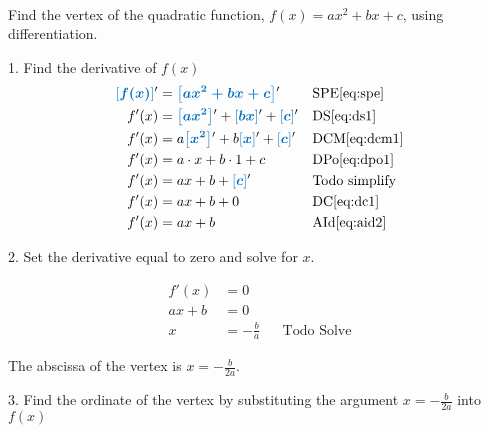 \documentclass[20150903-160354-rs2.2-MarksMathNotebook.tex]{subfiles}
\begin{document}
\begin{example}[id:20151008-110208] \label{20151008-110208} \hfill \\
Find the vertex of the quadratic function, $f(x)=ax^2+bx+c$, using differentiation.

\soln

\solnsteps

1. Find the derivative of $f(x)$
\begin{align*}
\farg{f(x)}' &= \farg{ax^2+bx+c}' && \text{SPE} \eqref{eq:spe} \\
f'(x) &= \farg{ax^2}' + \farg{bx}' + \farg{c}' && \text{DS} \eqref{eq:ds1} \\
f'(x) &= a\farg{x^2}' + b \farg{x}' + \farg{c}' && \text{DCM} \eqref{eq:dcm1} \\
f'(x) &= a \cdot{x} + b \cdot 1 + c && \text{DPo} \eqref{eq:dpo1} \\
f'(x) &= ax + b + \farg{c}'  &&\text{Todo simplify} \\
f'(x) &= ax + b + 0 && \text{DC} \eqref{eq:dc1} \\
f'(x) &= ax + b && \text{AId} \eqref{eq:aid2} \\
\end{align*}

2. Set the derivative equal to zero and solve for $x$.

\begin{align*}
f'(x) & = 0 \\
ax + b &= 0  \\
x &= -\frac{b}{a}  &&\text{Todo Solve}
\end{align*}

The abscissa of the vertex is $x=-\frac{b}{2a}$.

3.  Find the ordinate of the vertex by substituting the argument $x=-\frac{b}{2a}$ into $f(x)$

\end{example}
\end{document}
